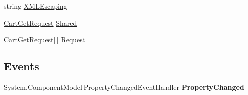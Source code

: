 \begin{DoxyCompactItemize}
\begin{DoxyCompactList}\small\item\em \end{DoxyCompactList}\item 
\hypertarget{class_amazon___price___finder_1_1amazon_1_1ecs_1_1_cart_get_aa3e5fd315782932b16b94e7f90034bc2}{string \hyperlink{class_amazon___price___finder_1_1amazon_1_1ecs_1_1_cart_get_aa3e5fd315782932b16b94e7f90034bc2}{X\-M\-L\-Escaping}}\label{class_amazon___price___finder_1_1amazon_1_1ecs_1_1_cart_get_aa3e5fd315782932b16b94e7f90034bc2}

\begin{DoxyCompactList}\small\item\em \end{DoxyCompactList}\item 
\hypertarget{class_amazon___price___finder_1_1amazon_1_1ecs_1_1_cart_get_a477361c1d752f883d24d334675a0770b}{\hyperlink{class_amazon___price___finder_1_1amazon_1_1ecs_1_1_cart_get_request}{Cart\-Get\-Request} \hyperlink{class_amazon___price___finder_1_1amazon_1_1ecs_1_1_cart_get_a477361c1d752f883d24d334675a0770b}{Shared}}\label{class_amazon___price___finder_1_1amazon_1_1ecs_1_1_cart_get_a477361c1d752f883d24d334675a0770b}

\begin{DoxyCompactList}\small\item\em \end{DoxyCompactList}\item 
\hypertarget{class_amazon___price___finder_1_1amazon_1_1ecs_1_1_cart_get_a58ff2bbe202858028e26b2279518bc8b}{\hyperlink{class_amazon___price___finder_1_1amazon_1_1ecs_1_1_cart_get_request}{Cart\-Get\-Request}\mbox{[}$\,$\mbox{]} \hyperlink{class_amazon___price___finder_1_1amazon_1_1ecs_1_1_cart_get_a58ff2bbe202858028e26b2279518bc8b}{Request}}\label{class_amazon___price___finder_1_1amazon_1_1ecs_1_1_cart_get_a58ff2bbe202858028e26b2279518bc8b}

\begin{DoxyCompactList}\small\item\em \end{DoxyCompactList}\end{DoxyCompactItemize}
\subsection*{Events}
\begin{DoxyCompactItemize}
\item 
\hypertarget{class_amazon___price___finder_1_1amazon_1_1ecs_1_1_cart_get_a71494e6c41909478582dca80ebc20c47}{System.\-Component\-Model.\-Property\-Changed\-Event\-Handler {\bfseries Property\-Changed}}\label{class_amazon___price___finder_1_1amazon_1_1ecs_1_1_cart_get_a71494e6c41909478582dca80ebc20c47}

\end{DoxyCompactItemize}


